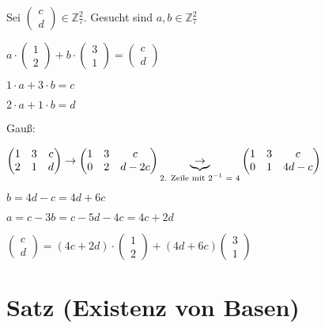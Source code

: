 \documentclass[a4paper, openany]{book}
\begin{document}
\begin{enumerate}[label=(\alph*)]
      Sei $\begin{pmatrix}c \\ d \end{pmatrix} \in \mathbb{Z}_7^2$. Gesucht sind $a,b \in \mathbb{Z}_7^2$

      $a \cdot \begin{pmatrix}1 \\ 2 \end{pmatrix} + b \cdot \begin{pmatrix}3 \\ 1 \end{pmatrix} = \begin{pmatrix}c \\ d \end{pmatrix}$

      $1 \cdot a + 3 \cdot b = c$ 

      $2 \cdot a + 1 \cdot b = d$

      Gauß:

      $\begin{pmatrix}1 & 3 & c \\ 2 & 1 & d \end{pmatrix} \rightarrow \begin{pmatrix}1 & 3 & c \\ 0 & 2 & d-2c \end{pmatrix} \underbrace{\rightarrow}_{\textnormal{2. Zeile mit $2^{-1}$ = 4}} \begin{pmatrix}1 & 3 & c \\ 0 & 1 & 4d-c \end{pmatrix}$

      $b = 4d-c = 4d + 6c$

      $a = c-3b = c-5d-4c = 4c+2d$

      $\begin{pmatrix}c \\ d\end{pmatrix} = (4c+2d) \cdot \begin{pmatrix}1 \\ 2 \end{pmatrix} + (4d +6c) \begin{pmatrix}3 \\ 1 \end{pmatrix}$
    \end{enumerate}

    \section{Satz (Existenz von Basen)}
\end{document}
